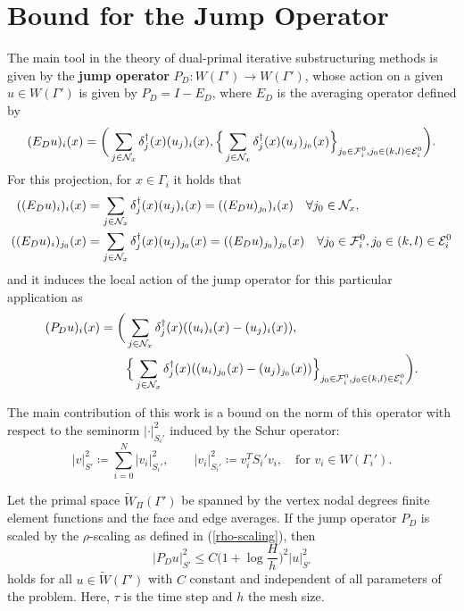 \section{Bound for the Jump Operator} \label{sec:proof}
The main tool in the theory of dual-primal iterative substructuring methods is given by the \textbf{jump operator} $P_D:W(\Gamma') \rightarrow W(\Gamma')$, whose action on a given $u \in W(\Gamma')$ is given by $P_D = I - E_D$, where $E_D$ is the averaging operator defined by
\begin{equation}
    (E_Du)_i(x) = \bigg( \sum_{j \in \mathcal{N}_x} \delta_j^{\dag}(x) (u_j)_i(x), \Big\{\sum_{j \in \mathcal{N}_x} \delta_j^{\dag}(x) (u_j)_{j_0}(x) \Big\}_{j_0 \in \mathcal{F}_i^0, j_0 \in (k,l) \in \mathcal{E}_i^0} \bigg).
\end{equation}
For this projection, for $x \in \Gamma_i$ it holds that
\begin{equation*}
    \begin{split}
        ((E_Du)_i)_i(x) & = \sum_{j \in \mathcal{N}_x} \delta_j^{\dag}(x) (u_j)_i(x) = ((E_D u)_{j_0})_i(x) \quad \forall j_0 \in \mathcal{N}_x, \\
        ((E_Du)_i)_{j_0}(x) & = \sum_{j \in \mathcal{N}_x} \delta_j^{\dag}(x) (u_j)_{j_0}(x) = ((E_Du)_{j_0})_{j_0}(x) \quad \forall j_0 \in \mathcal{F}_i^0, j_0 \in (k,l) \in \mathcal{E}_i^0
    \end{split}
\end{equation*}
and it induces the local action of the jump operator for this particular application as
\begin{equation}
    \begin{split}
    (P_Du)_i(x) = \bigg( & \sum_{j \in \mathcal{N}_x} \delta_j^{\dag}(x)((u_i)_i(x) - (u_j)_i(x)), \\
    & \Big\{ \sum_{j \in \mathcal{N}_x} \delta_j^{\dag}(x)((u_i)_{j_0}(x) - (u_j)_{j_0}(x))\Big\}_{j_0 \in \mathcal{F}_i^0, j_0 \in (k,l) \in \mathcal{E}_i^0} \bigg).
    \end{split}
\end{equation}

The main contribution of this work is a bound on the norm of this operator with respect to the seminorm $|\cdot|^2_{S_i'}$ induced by the Schur operator:
\[|v|_{S'}^2 \coloneqq \sum_{i = 0}^N |v_i|_{S_i'}^2, \quad \quad |v_i|_{S_i'}^2 \coloneqq v_i^TS_i'v_i, \quad \text{for } v_i \in W(\Gamma_i').\]

\begin{lemma}
\label{lemma-full-primal}
    Let the primal space $\widetilde W_{\Pi}(\Gamma')$ be spanned by the vertex nodal degrees finite element functions and the face and edge averages. If the jump operator $P_D$ is scaled by the $\rho$-scaling as defined in (\ref{rho-scaling}), then
    \begin{equation}
        |P_Du|_{S'}^2 \leq C \bigg(1 + \log \frac{H}{h} \bigg)^2 |u|_{S'}^2
    \end{equation}
    holds for all $u \in \widetilde W(\Gamma')$ with $C$ constant and independent of all parameters of the problem. Here, $\tau$ is the time step and $h$ the mesh size.
\end{lemma}

